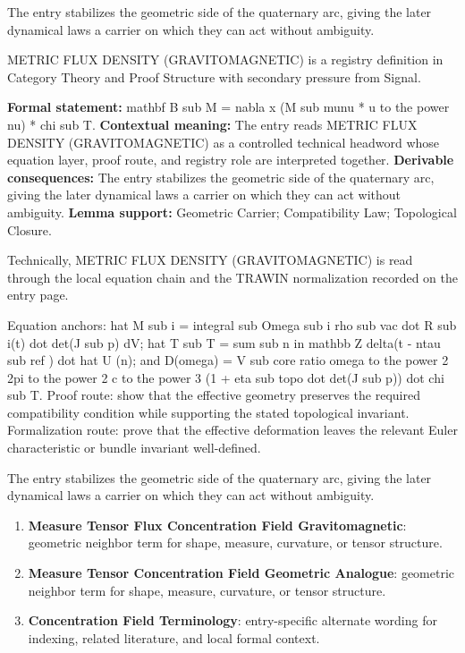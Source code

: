 The entry stabilizes the geometric side of the quaternary arc, giving the later dynamical laws a carrier on which they can act without ambiguity.
\clearpage


\begingroup\small
{}
METRIC FLUX DENSITY (GRAVITOMAGNETIC) is a registry definition in Category Theory and Proof Structure with secondary pressure from Signal.

\begingroup\footnotesize\setlength{\emergencystretch}{3em}\sloppy
\textbf{Formal statement:} mathbf B sub M = nabla x (M sub munu * u to the power nu) * chi sub T. \textbf{Contextual meaning:} The entry reads METRIC FLUX DENSITY (GRAVITOMAGNETIC) as a controlled technical headword whose equation layer, proof route, and registry role are interpreted together. \textbf{Derivable consequences:} The entry stabilizes the geometric side of the quaternary arc, giving the later dynamical laws a carrier on which they can act without ambiguity. \textbf{Lemma support:} Geometric Carrier; Compatibility Law; Topological Closure.\par
\endgroup

Technically, METRIC FLUX DENSITY (GRAVITOMAGNETIC) is read through the local equation chain and the TRAWIN normalization recorded on the entry page.

Equation anchors: hat M sub i = integral sub Omega sub i rho sub vac dot R sub i(t) dot det(J sub p) dV; hat T sub T = sum sub n in mathbb Z delta(t - ntau sub ref ) dot hat U (n); and D(omega) = V sub core ratio omega to the power 2 2pi to the power 2 c to the power 3 (1 + eta sub topo dot det(J sub p)) dot chi sub T. Proof route: show that the effective geometry preserves the required compatibility condition while supporting the stated topological invariant. Formalization route: prove that the effective deformation leaves the relevant Euler characteristic or bundle invariant well-defined.

The entry stabilizes the geometric side of the quaternary arc, giving the later dynamical laws a carrier on which they can act without ambiguity.
\endgroup

\begin{enumerate}[leftmargin=1.6em,itemsep=6pt,topsep=4pt]
\item \textbf{Measure Tensor Flux Concentration Field Gravitomagnetic}: geometric neighbor term for shape, measure, curvature, or tensor structure.
\item \textbf{Measure Tensor Concentration Field Geometric Analogue}: geometric neighbor term for shape, measure, curvature, or tensor structure.
\item \textbf{Concentration Field Terminology}: entry-specific alternate wording for indexing, related literature, and local formal context.
\end{enumerate}

